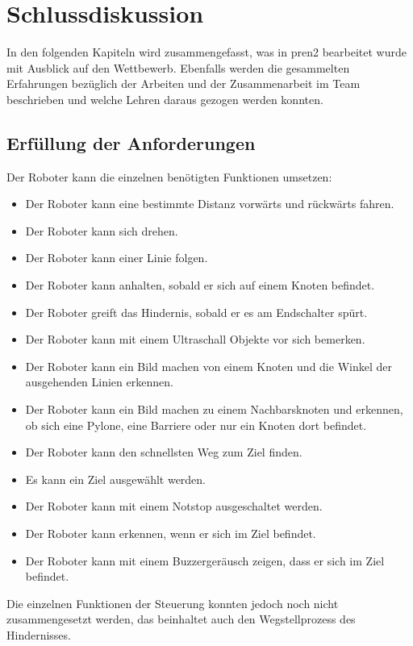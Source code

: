 \section{Schlussdiskussion}

In den folgenden Kapiteln wird zusammengefasst, was in \acrshort{pren2} bearbeitet wurde mit Ausblick auf den Wettbewerb.
Ebenfalls werden die gesammelten Erfahrungen bezüglich der Arbeiten und der Zusammenarbeit im Team beschrieben und welche Lehren daraus gezogen werden konnten.

\subsection{Erfüllung der Anforderungen}

Der Roboter kann die einzelnen benötigten Funktionen umsetzen:

\begin{itemize}
    \item Der Roboter kann eine bestimmte Distanz vorwärts und rückwärts fahren.
    \item Der Roboter kann sich drehen.
    \item Der Roboter kann einer Linie folgen.
    \item Der Roboter kann anhalten, sobald er sich auf einem Knoten befindet.
    \item Der Roboter greift das Hindernis, sobald er es am Endschalter spürt.
    \item Der Roboter kann mit einem Ultraschall Objekte vor sich bemerken.
    \item Der Roboter kann ein Bild machen von einem Knoten und die Winkel der ausgehenden Linien erkennen.
    \item Der Roboter kann ein Bild machen zu einem Nachbarsknoten und erkennen, ob sich eine Pylone, eine Barriere oder nur ein Knoten dort befindet.
    \item Der Roboter kann den schnellsten Weg zum Ziel finden.
    \item Es kann ein Ziel ausgewählt werden.
    \item Der Roboter kann mit einem Notstop ausgeschaltet werden.
    \item Der Roboter kann erkennen, wenn er sich im Ziel befindet.
    \item Der Roboter kann mit einem Buzzergeräusch zeigen, dass er sich im Ziel befindet.
\end{itemize}

Die einzelnen Funktionen der Steuerung konnten jedoch noch nicht zusammengesetzt werden, das beinhaltet auch den Wegstellprozess des Hindernisses.


